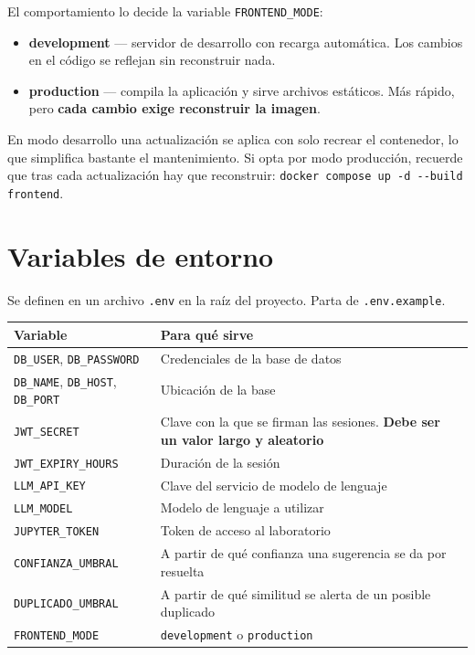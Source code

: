 El comportamiento lo decide la variable \texttt{FRONTEND\_MODE}:

\begin{itemize}[leftmargin=*, itemsep=3pt]
  \item \textbf{development} — servidor de desarrollo con recarga automática.
        Los cambios en el código se reflejan sin reconstruir nada.
  \item \textbf{production} — compila la aplicación y sirve archivos estáticos.
        Más rápido, pero \textbf{cada cambio exige reconstruir la imagen}.
\end{itemize}

\begin{nota}
En modo desarrollo una actualización se aplica con solo recrear el contenedor,
lo que simplifica bastante el mantenimiento. Si opta por modo producción,
recuerde que tras cada actualización hay que reconstruir:
\texttt{docker compose up -d -{}-build frontend}.
\end{nota}

\newpage
\section{Variables de entorno}

Se definen en un archivo \texttt{.env} en la raíz del proyecto. Parta de
\texttt{.env.example}.

\begin{center}
\begin{tabular}{@{}lp{8.4cm}@{}}
\toprule
\textbf{Variable} & \textbf{Para qué sirve} \\
\midrule
\texttt{DB\_USER}, \texttt{DB\_PASSWORD} & Credenciales de la base de datos \\
\texttt{DB\_NAME}, \texttt{DB\_HOST}, \texttt{DB\_PORT} & Ubicación de la base \\
\texttt{JWT\_SECRET} & Clave con la que se firman las sesiones. \textbf{Debe ser un valor largo y aleatorio} \\
\texttt{JWT\_EXPIRY\_HOURS} & Duración de la sesión \\
\texttt{LLM\_API\_KEY} & Clave del servicio de modelo de lenguaje \\
\texttt{LLM\_MODEL} & Modelo de lenguaje a utilizar \\
\texttt{JUPYTER\_TOKEN} & Token de acceso al laboratorio \\
\texttt{CONFIANZA\_UMBRAL} & A partir de qué confianza una sugerencia se da por resuelta \\
\texttt{DUPLICADO\_UMBRAL} & A partir de qué similitud se alerta de un posible duplicado \\
\texttt{FRONTEND\_MODE} & \texttt{development} o \texttt{production} \\
\bottomrule
\end{tabular}
\end{center}

